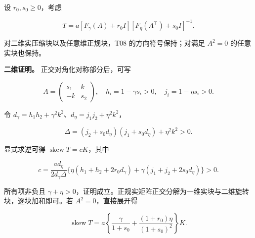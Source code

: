 \documentclass[11pt,a4paper]{article}
\begin{document}
\par
\noindent\begin{minipage}{\linewidth}

设 \(r_0,s_0\ge0\)，考虑

\[
T=a[F_\gamma(A)+r_0I][F_\eta(A^\top)+s_0I]^{-1}.
\]

\end{minipage}\par

对二维实压缩块以及任意维正规块，T08 的方向符号保持；对满足 \(A^2=0\)
的任意实块也保持。

\par
\noindent\begin{minipage}{\linewidth}

\textbf{二维证明。} 正交对角化对称部分后，可写

\[
A=\begin{pmatrix}s_1&k\\-k&s_2\end{pmatrix},\quad
h_i=1-\gamma s_i>0,\quad j_i=1-\eta s_i>0.
\]

\end{minipage}\par

\par
\noindent\begin{minipage}{\linewidth}

令 \(d_\gamma=h_1h_2+\gamma^2k^2\)、\(d_\eta=j_1j_2+\eta^2k^2\)，

\[
\Delta=(j_2+s_0d_\eta)(j_1+s_0d_\eta)+\eta^2k^2>0.
\]

\end{minipage}\par

\par
\noindent\begin{minipage}{\linewidth}

显式求逆可得 \(\operatorname{skew}T=cK\)，其中

\[
c=\frac{a d_\eta}{2d_\gamma\Delta}
\{\eta(h_1+h_2+2r_0d_\gamma)+
\gamma(j_1+j_2+2s_0d_\eta)\}>0.
\]

\end{minipage}\par

\par
\noindent\begin{minipage}{\linewidth}

所有项非负且
\(\gamma+\eta>0\)，证明成立。正规实矩阵正交分解为一维实块与二维旋转块，逐块加和即可。若
\(A^2=0\)，直接展开得

\[
\operatorname{skew}T
=a\left\{\frac{\gamma}{1+s_0}
+\frac{(1+r_0)\eta}{(1+s_0)^2}\right\}K.
\]

\end{minipage}\par
\end{document}

